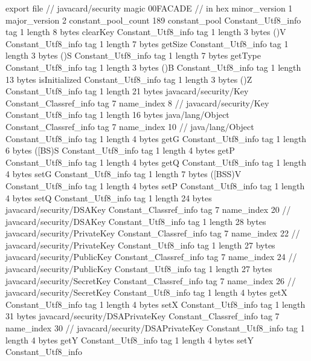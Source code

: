 export file {		// javacard/security
	magic	00FACADE		 // in hex
	minor_version	1
	major_version	2
	constant_pool_count	189
	constant_pool {
		Constant_Utf8_info {
			tag	1
			length	8
			bytes	clearKey
		}
		Constant_Utf8_info {
			tag	1
			length	3
			bytes	()V
		}
		Constant_Utf8_info {
			tag	1
			length	7
			bytes	getSize
		}
		Constant_Utf8_info {
			tag	1
			length	3
			bytes	()S
		}
		Constant_Utf8_info {
			tag	1
			length	7
			bytes	getType
		}
		Constant_Utf8_info {
			tag	1
			length	3
			bytes	()B
		}
		Constant_Utf8_info {
			tag	1
			length	13
			bytes	isInitialized
		}
		Constant_Utf8_info {
			tag	1
			length	3
			bytes	()Z
		}
		Constant_Utf8_info {
			tag	1
			length	21
			bytes	javacard/security/Key
		}
		Constant_Classref_info {
			tag	7
			name_index	8		// javacard/security/Key
		}
		Constant_Utf8_info {
			tag	1
			length	16
			bytes	java/lang/Object
		}
		Constant_Classref_info {
			tag	7
			name_index	10		// java/lang/Object
		}
		Constant_Utf8_info {
			tag	1
			length	4
			bytes	getG
		}
		Constant_Utf8_info {
			tag	1
			length	6
			bytes	([BS)S
		}
		Constant_Utf8_info {
			tag	1
			length	4
			bytes	getP
		}
		Constant_Utf8_info {
			tag	1
			length	4
			bytes	getQ
		}
		Constant_Utf8_info {
			tag	1
			length	4
			bytes	setG
		}
		Constant_Utf8_info {
			tag	1
			length	7
			bytes	([BSS)V
		}
		Constant_Utf8_info {
			tag	1
			length	4
			bytes	setP
		}
		Constant_Utf8_info {
			tag	1
			length	4
			bytes	setQ
		}
		Constant_Utf8_info {
			tag	1
			length	24
			bytes	javacard/security/DSAKey
		}
		Constant_Classref_info {
			tag	7
			name_index	20		// javacard/security/DSAKey
		}
		Constant_Utf8_info {
			tag	1
			length	28
			bytes	javacard/security/PrivateKey
		}
		Constant_Classref_info {
			tag	7
			name_index	22		// javacard/security/PrivateKey
		}
		Constant_Utf8_info {
			tag	1
			length	27
			bytes	javacard/security/PublicKey
		}
		Constant_Classref_info {
			tag	7
			name_index	24		// javacard/security/PublicKey
		}
		Constant_Utf8_info {
			tag	1
			length	27
			bytes	javacard/security/SecretKey
		}
		Constant_Classref_info {
			tag	7
			name_index	26		// javacard/security/SecretKey
		}
		Constant_Utf8_info {
			tag	1
			length	4
			bytes	getX
		}
		Constant_Utf8_info {
			tag	1
			length	4
			bytes	setX
		}
		Constant_Utf8_info {
			tag	1
			length	31
			bytes	javacard/security/DSAPrivateKey
		}
		Constant_Classref_info {
			tag	7
			name_index	30		// javacard/security/DSAPrivateKey
		}
		Constant_Utf8_info {
			tag	1
			length	4
			bytes	getY
		}
		Constant_Utf8_info {
			tag	1
			length	4
			bytes	setY
		}
		Constant_Utf8_info {
}}}
